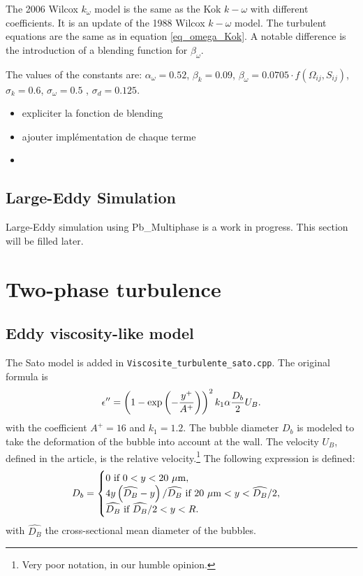 The 2006 Wilcox $k_\omega$ model \cite{Wilcox2006} is the same as the Kok $k-\omega$ with different coefficients. It is an update of the 1988 Wilcox $k-\omega$ model. The turbulent equations are the same as in equation \ref{eq_omega_Kok}. A notable difference is the introduction of a blending function for $\beta_{\omega}$. 

The values of the constants are: $\alpha_{\omega} = 0.52$, $\beta_{k} = 0.09$, $\beta_{\omega} = 0.0705\cdot f(\Omega_{ij},S_{ij})$, $\sigma_k = 0.6$, $\sigma_{\omega} = 0.5$ , $\sigma_d = 0.125$.

\begin{itemize}
    \item expliciter la fonction de blending
    \item ajouter implémentation de chaque terme
    \item 
\end{itemize}

\subsection{Large-Eddy Simulation}

Large-Eddy simulation using Pb_Multiphase is a work in progress. This section will be filled later.

\section{Two-phase turbulence}

\subsection{Eddy viscosity-like model}

The Sato model \cite{Sato1981a} is added in \texttt{Viscosite_turbulente_sato.cpp}. The original formula is
\begin{equation}
\epsilon''=\left( 1-\exp\left( -\frac{y^+}{A^+} \right) \right)^2 k_1 \alpha \frac{D_b}{2}U_B.
\end{equation}
with the coefficient $A^+=16$ and $k_1 = 1.2$. The bubble diameter $D_b$ is modeled to take the deformation of the bubble into account at the wall. The velocity $U_B$, defined in the article, is the relative velocity.\footnote{Very poor notation, in our humble opinion.} The following expression is defined:
\begin{equation}
    D_b = \begin{cases}
    0\ \text{if}\ 0 < y < 20~\unit{\mu m},\\
    4y\parent{\widehat{D_B}-y}/\widehat{D_B}\ \text{if}\ 20~\unit{\mu m} < y < \widehat{D_B}/2,\\
    \widehat{D_B}\ \text{if}\ \widehat{D_B}/2 < y < R.
    \end{cases}
\end{equation}
with $\widehat{D_B}$ the cross-sectional mean diameter of the bubbles.

